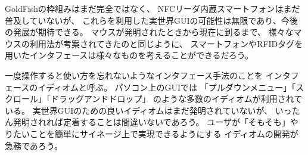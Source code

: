 \documentclass[a4j,11pt,twocolumn]{jarticle}
\def\SP{スマートフォン}
\begin{document}
GoldFishの枠組みはまだ完全ではなく、
NFCリーダ内蔵{\SP}はまだ普及していないが、
これらを利用した実世界GUIの可能性は無限であり、今後の発展が期待できる。
マウスが発明されたときから現在に到るまで、
様々なマウスの利用法が考案されてきたのと同じように、
{\SP}やRFIDタグを用いたインタフェースは様々なものを考えることができるだろう。

一度操作すると使い方を忘れないようなインタフェース手法のことを
インタフェースのイディオムと呼ぶ。
パソコン上のGUIでは
「プルダウンメニュー」「スクロール」「ドラッグアンドドロップ」
のような多数のイディオムが利用されている。
実世界GUIのための良いイディオムはまだ発明されていないが、
いったん発明されれば定着することは間違いないであろう。
ユーザが「そもそも」やりたいことを簡単にサイネージ上で実現できるようにする
イディオムの開発が急務であろう。

\scriptsize


\end{document}
